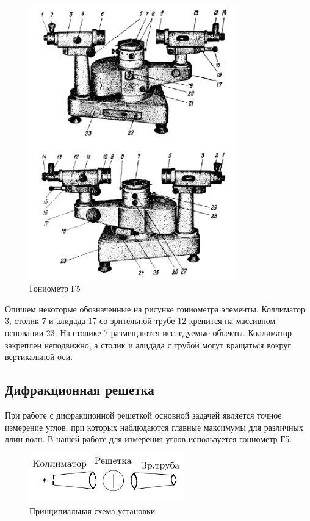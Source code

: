 \documentclass[a4paper, 12pt]{article}
\begin{document}
\begin{figure}[h]
\begin{center}
\includegraphics[width=0.8\textwidth]{Гониометр.png}
\end{center}
\caption{Гониометр Г5} \label{Гониометр}
\end{figure}

Опишем некоторые обозначенные на рисунке гониометра элементы. Коллиматор 3, столик 7 и алидада 17 со зрительной трубе 12 крепится на массивном основании 23. На столике 7 размещаются исследуемые объекты. Коллиматор закреплен неподвижно, а столик и алидада с трубой могут вращаться вокруг вертикальной оси.

\subsection*{Дифракционная решетка}

При работе с дифракционной решеткой основной задачей является точное измерение углов, при которых наблюдаются главные максимумы для различных длин волн. В нашей работе для измерения углов используется гониометр Г5. 

\begin{figure}[h]
\begin{center}
\includegraphics[width=0.6\textwidth]{Принципиальная_схема_установки.png}
\end{center}
\caption{Принципиальная схема установки} \label{Схема}
\end{figure}
\end{document}
